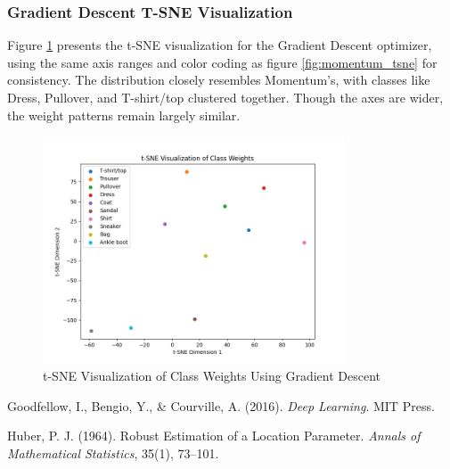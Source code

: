 \documentclass{article}
\begin{document}
\subsubsection{Gradient Descent T-SNE Visualization}

Figure \ref{fig:gd_tsne} presents the t-SNE visualization for the Gradient Descent optimizer, using the same axis ranges and color coding as figure \ref{fig:momentum_tsne} for consistency. The distribution closely resembles Momentum’s, with classes like Dress, Pullover, and T-shirt/top clustered together. Though the axes are wider, the weight patterns remain largely similar.

\begin{figure}[H]
    \centering
    \includegraphics[width=0.8\textwidth]{assets/q2/gradient_descent/tsne_100_epochs.png}
    \caption{t-SNE Visualization of Class Weights Using Gradient Descent}
    \label{fig:gd_tsne}
\end{figure}

\begin{thebibliography}{9}

Goodfellow, I., Bengio, Y., \& Courville, A. (2016). \emph{Deep Learning}. MIT Press.

Huber, P. J. (1964). Robust Estimation of a Location Parameter. \emph{Annals of Mathematical Statistics}, 35(1), 73--101.

\end{thebibliography}
\end{document}
